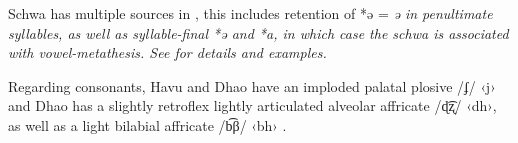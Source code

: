 Schwa has multiple sources in ,
this includes retention of *ə = \it{ə} in penultimate syllables,
as well as syllable-final *ə and *a, in which case the
schwa is associated with vowel-metathesis.
See  for details and examples.

Regarding consonants, Havu and Dhao have 
an imploded palatal plosive /ʄ/ ‹j{\Q}›
and Dhao has a slightly retroflex lightly
articulated alveolar affricate /ɖ͡ʐ/ ‹dh›,
as well as a light bilabial affricate /b͡β/ ‹bh›
\citep[256]{Grimes2010a}.
